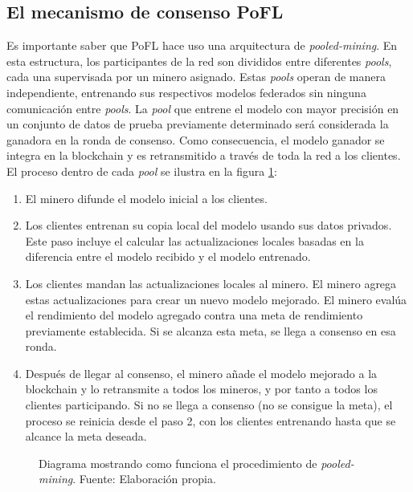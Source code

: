 \subsection{El mecanismo de consenso PoFL}
Es importante saber que \ac{PoFL} hace uso una arquitectura de \textit{pooled-mining}. En esta estructura, los participantes de la red son divididos entre diferentes \textit{pools}, cada una supervisada por un minero asignado. Estas \textit{pools} operan de manera independiente, entrenando sus respectivos modelos federados sin ninguna comunicación entre \textit{pools}. La \textit{pool} que entrene el modelo con mayor precisión en un conjunto de datos de prueba previamente determinado será considerada la ganadora en la ronda de consenso. Como consecuencia, el modelo ganador se integra en la blockchain y es retransmitido a través de toda la red a los clientes. El proceso dentro de cada \textit{pool} se ilustra en la figura \ref{fig:pooledmining}:
\begin{enumerate}
	\item El minero difunde el modelo inicial a los clientes.
	\item Los clientes entrenan su copia local del modelo usando sus datos privados. Este paso incluye el calcular las actualizaciones locales basadas en la diferencia entre el modelo recibido y el modelo entrenado.
	\item Los clientes mandan las actualizaciones locales al minero. El minero agrega estas actualizaciones para crear un nuevo modelo mejorado. El minero evalúa el rendimiento del modelo agregado contra una meta de rendimiento previamente establecida. Si se alcanza esta meta, se llega a consenso en esa ronda.
	\item Después de llegar al consenso, el minero añade el modelo mejorado a la blockchain y lo retransmite a todos los mineros, y por tanto a todos los clientes participando. Si no se llega a consenso (no se consigue la meta), el proceso se reinicia desde el paso 2, con los clientes entrenando hasta que se alcance la meta deseada.
\end{enumerate}

\begin{figure}[ht]
	\centering
	
	\caption{Diagrama mostrando como funciona el procedimiento de \textit{pooled-mining}. Fuente: Elaboración propia.}
	\label{fig:pooledmining}
\end{figure}

